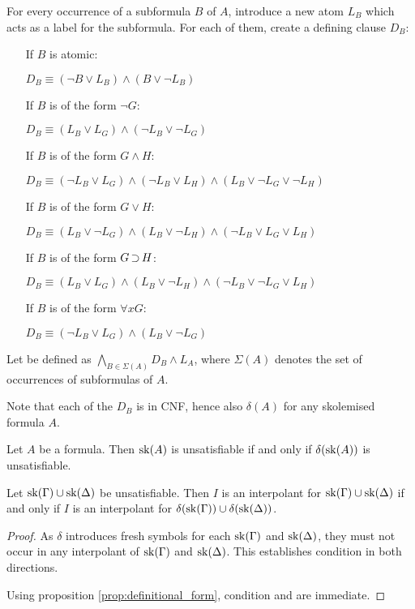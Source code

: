 \begin{defi}
For every occurrence of a subformula $B$ of $A$, introduce a new atom $L_B$ which acts as a label for the subformula. 
For each of them, create a defining clause $D_B$:

\begin{itemize}
	\item[If $B$ is atomic:]~

	$D_B\equiv (\lnot B \lor L_B) \land (B \lor \lnot L_B)  $
	\item[If $B$ is of the form $\lnot G$:]~

	$D_B\equiv (L_B \lor L_G) \land (\lnot L_B \lor \lnot L_G)  $
	\item[If $B$ is of the form $G \land H$:]~

		$D_B\equiv (\lnot L_B \lor L_G) \land (\lnot L_B \lor L_H) \land (L_B \lor \lnot L_G \lor \lnot L_H)  $
	\item[If $B$ is of the form $G \lor H$:]~

		$D_B\equiv (L_B \lor \lnot L_G) \land (L_B \lor \lnot L_H) \land (\lnot L_B \lor L_G \lor L_H)  $
	\item[If $B$ is of the form $G \operatorname{\supset} H$:]~

		$D_B\equiv (L_B \lor L_G) \land (L_B \lor \lnot L_H) \land (\lnot L_B \lor \lnot L_G \lor L_H)  $
	\item[If $B$ is of the form $\forall x G$:]~

		$D_B\equiv (\lnot L_B \lor L_G) \land (L_B \lor \lnot L_G)$
\end{itemize}

Let  be defined as $\bigwedge_{B \in \Sigma(A)} D_B \land L_A$, where $\Sigma(A)$ denotes the set of occurrences of subformulas of $A$.
\end{defi}

Note that each of the $D_B$ is in CNF, hence also $\delta(A)$ for any skolemised formula $A$.

\begin{prop}
	\label{prop:definitional_form}
	Let $A$ be a formula. Then $\operatorname{sk}(A)$ is unsatisfiable if and only if $\delta(\operatorname{sk}(A))$ is unsatisfiable.
\end{prop}

\begin{prop}
	Let $\operatorname{sk}(\Gamma) \cup \operatorname{sk}(\Delta)$ be unsatisfiable.
	Then $I$ is an interpolant for \mbox{$\operatorname{sk}(\Gamma) \cup \operatorname{sk}(\Delta)$} if and only if 
	$I$ is an interpolant for $\delta(\operatorname{sk}(\Gamma)) \cup \delta(\operatorname{sk}(\Delta))$.
\end{prop}
\begin{proof}
	As $\delta$ introduces fresh symbols for each $\operatorname{sk}(\Gamma)$ and $\operatorname{sk}(\Delta)$, they must not occur in any interpolant of $\operatorname{sk}(\Gamma)$ and $\operatorname{sk}(\Delta)$. 
	This establishes condition  in both directions.

Using proposition \ref{prop:definitional_form}, condition  and  are immediate.
\end{proof}

